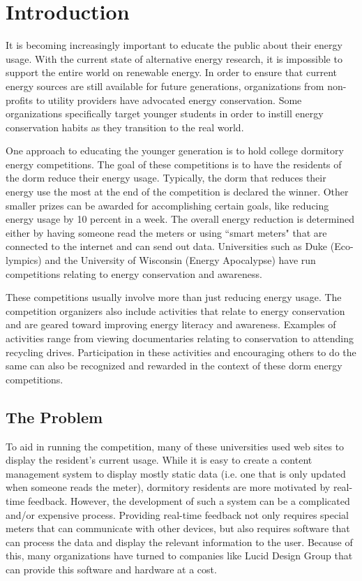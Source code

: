 \chapter{Introduction}
It is becoming increasingly important to educate the public about their energy usage.  With the current state of alternative energy research, it is impossible to support the entire world on renewable energy.  In order to ensure that current energy sources are still available for future generations, organizations from non-profits to utility providers have advocated energy conservation.  Some organizations specifically target younger students in order to instill energy conservation habits as they transition to the real world.

One approach to educating the younger generation is to hold college dormitory energy competitions.  The goal of these competitions is to have the residents of the dorm reduce their energy usage.  Typically, the dorm that reduces their energy use the most at the end of the competition is declared the winner.  Other smaller prizes can be awarded for accomplishing certain goals, like reducing energy usage by 10 percent in a week.  The overall energy reduction is determined either by having someone read the meters or using ``smart meters" that are connected to the internet and can send out data.  Universities such as Duke (Eco-lympics) and the University of Wisconsin (Energy Apocalypse) have run competitions relating to energy conservation and awareness. 

These competitions usually involve more than just reducing energy usage.  The competition organizers also include activities that relate to energy conservation and are geared toward improving energy literacy and awareness.  Examples of activities range from viewing documentaries relating to conservation to attending recycling drives.  Participation in these activities and encouraging others to do the same can also be recognized and rewarded in the context of these dorm energy competitions.

\section{The Problem}

To aid in running the competition, many of these universities used web sites to display the resident's current usage.  While it is easy to create a content management system to display mostly static data (i.e. one that is only updated when someone reads the meter), dormitory residents are more motivated by real-time feedback\cite{oberlin-feedback}.  However, the development of such a system can be a complicated and/or expensive process.  Providing real-time feedback not only requires special meters that can communicate with other devices, but also requires software that can process the data and display the relevant information to the user.  Because of this, many organizations have turned to companies like Lucid Design Group that can provide this software and hardware at a cost.

